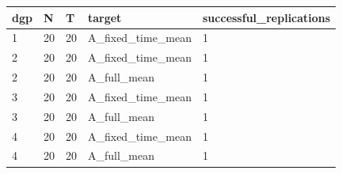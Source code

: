 \begin{tabular}{lllll}
\toprule
dgp & N & T & target & successful\_replications \\
\midrule
1 & 20 & 20 & A\_fixed\_time\_mean & 1 \\
2 & 20 & 20 & A\_fixed\_time\_mean & 1 \\
2 & 20 & 20 & A\_full\_mean & 1 \\
3 & 20 & 20 & A\_fixed\_time\_mean & 1 \\
3 & 20 & 20 & A\_full\_mean & 1 \\
4 & 20 & 20 & A\_fixed\_time\_mean & 1 \\
4 & 20 & 20 & A\_full\_mean & 1 \\
\bottomrule
\end{tabular}

